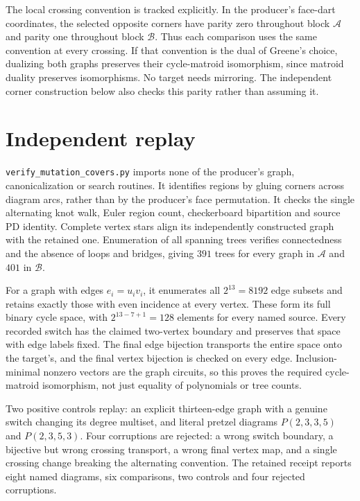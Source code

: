 \documentclass[11pt]{article}
\begin{document}
The local crossing convention is tracked explicitly. In the producer's
face-dart coordinates, the selected opposite corners have parity zero
throughout block $\mathcal A$ and parity one throughout block $\mathcal B$.
Thus each comparison uses the same convention at every crossing.
If that convention is the dual of Greene's choice, dualizing both
graphs preserves their cycle-matroid isomorphism, since matroid duality
preserves isomorphisms. No target needs mirroring. The independent corner
construction below also checks this parity rather than assuming it.

\section{Independent replay}

\texttt{verify\_mutation\_covers.py} imports none of the producer's graph,
canonicalization or search routines. It identifies regions by gluing
corners across diagram arcs, rather than by the producer's face
permutation. It checks the single alternating knot walk, Euler region
count, checkerboard bipartition and source PD identity. Complete vertex
stars align its independently constructed graph with the retained one.
Enumeration of all spanning trees verifies connectedness and the
absence of loops and bridges, giving $391$ trees for every graph in
$\mathcal A$ and $401$ in $\mathcal B$.

For a graph with edges $e_i=u_iv_i$, it enumerates all $2^{13}=8192$
edge subsets and retains exactly those with even incidence at every
vertex. These form its full binary cycle space, with
$2^{13-7+1}=128$ elements for every named source. Every recorded switch
has the claimed two-vertex boundary and preserves that space with edge
labels fixed. The final edge bijection transports the entire space
onto the target's, and the final vertex bijection is checked on every
edge. Inclusion-minimal nonzero vectors are the graph circuits, so this
proves the required cycle-matroid isomorphism, not just equality of
polynomials or tree counts.

Two positive controls replay: an explicit thirteen-edge graph with a
genuine switch changing its degree multiset, and literal pretzel
diagrams $P(2,3,3,5)$ and $P(2,3,5,3)$. Four corruptions are rejected:
a wrong switch boundary, a bijective but wrong crossing transport, a
wrong final vertex map, and a single crossing change breaking the
alternating convention. The retained receipt reports eight named
diagrams, six comparisons, two controls and four rejected corruptions.
\end{document}
